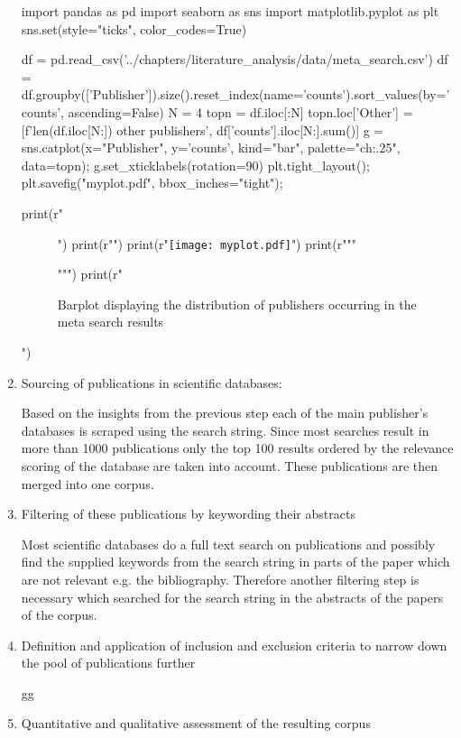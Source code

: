 \begin{enumerate}
\begin{pycode}
import pandas as pd
import seaborn as sns
import matplotlib.pyplot as plt
sns.set(style="ticks", color_codes=True)


df = pd.read_csv('../chapters/literature_analysis/data/meta_search.csv')
df = df.groupby(['Publisher']).size().reset_index(name='counts').sort_values(by='counts', ascending=False)
N = 4
topn = df.iloc[:N]
topn.loc['Other'] = [f'{len(df.iloc[N:])} other publishers', df['counts'].iloc[N:].sum()]
g = sns.catplot(x="Publisher", y='counts', kind="bar", palette="ch:.25", data=topn);
g.set_xticklabels(rotation=90)
plt.tight_layout();
plt.savefig("myplot.pdf", bbox_inches="tight");

print(r"\begin{figure}[tbp]")
print(r"\centering")
print(r"\texttt{[image: myplot.pdf]}")
print(r"""\caption{\label{fig:publisher_distribution}%
	Barplot displaying the distribution of publishers occurring in the meta search results}""")
print(r"\end{figure}")
\end{pycode}

	\item Sourcing of publications in scientific databases:
	
	Based on the insights from the previous step each of the main publisher's databases is scraped using the search string. Since most searches result in more than 1000 publications only the top 100 results ordered by the relevance scoring of the database are taken into account. These publications are then merged into one corpus.
	
	\item Filtering of these publications by keywording their abstracts
	
	Most scientific databases do a full text search on publications and possibly find the supplied keywords from the search string in parts of the paper which are not relevant e.g. the bibliography. Therefore another filtering step is necessary which searched for the search string in the abstracts of the papers of the corpus.
	
	\item Definition and application of inclusion and exclusion criteria to narrow down the pool of publications further
	
	gg
	\item Quantitative and qualitative assessment of the resulting corpus
\end{enumerate}

